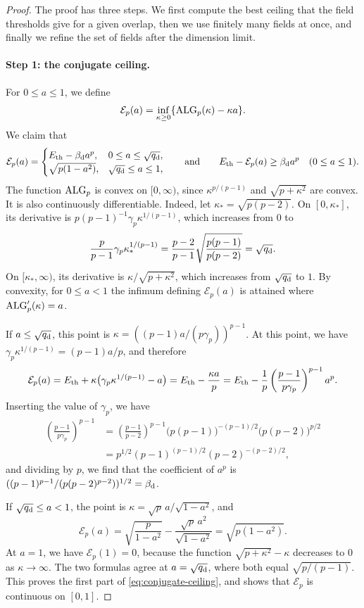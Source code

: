 \begin{proof}
The proof has three steps. We first compute the best ceiling that the field
thresholds give for a given overlap, then we use finitely many fields at
once, and finally we refine the set of fields after the dimension limit.

\paragraph{Step 1: the conjugate ceiling.}
For $0\le a\le1$, we define
\[
 \mathcal E_p(a)=\inf_{\kappa\ge0}\{\operatorname{ALG}_p(\kappa)-\kappa a\}.
\]
We claim that
\begin{equation}\label{eq:conjugate-ceiling}
 \mathcal E_p(a)=
 \begin{cases}
 E_{\mathrm{th}}-\beta_{\mathrm d} a^p,&0\le a\le\sqrt{q_{\mathrm d}},\\
 \sqrt{p(1-a^2)},&\sqrt{q_{\mathrm d}}\le a\le1,
 \end{cases}
 \qquad\text{and}\qquad
 E_{\mathrm{th}}-\mathcal E_p(a)\ge\beta_{\mathrm d} a^p\quad(0\le a\le1).
\end{equation}
The function $\operatorname{ALG}_p$ is convex on $[0,\infty)$, since $\kappa^{p/(p-1)}$ and
$\sqrt{p+\kappa^2}$ are convex. It is also continuously differentiable. Indeed, let $\kappa_*=\sqrt{p(p-2)}$. On $[0,\kappa_*]$, its derivative
is $p(p-1)^{-1}\gamma_p\kappa^{1/(p-1)}$, which increases from $0$ to
\[
 \frac p{p-1}\gamma_p\kappa_*^{1/(p-1)}
 =\frac{p-2}{p-1}\sqrt{\frac{p(p-1)}{p(p-2)}}=\sqrt{q_{\mathrm d}}.
\]
On $[\kappa_*,\infty)$, its derivative is $\kappa/\sqrt{p+\kappa^2}$,
which increases from $\sqrt{q_{\mathrm d}}$ to $1$. By convexity, for $0\le a<1$ the
infimum defining $\mathcal E_p(a)$ is attained where $\operatorname{ALG}_p'(\kappa)=a$.

If $a\le\sqrt{q_{\mathrm d}}$, this point is
$\kappa=((p-1)a/(p\gamma_p))^{p-1}$. At this point, we have $\gamma_p\kappa^{1/(p-1)}=(p-1)a/p$, and therefore
\[
 \mathcal E_p(a)=E_{\mathrm{th}}+\kappa\big(\gamma_p\kappa^{1/(p-1)}-a\big)
 =E_{\mathrm{th}}-\frac{\kappa a}p
 =E_{\mathrm{th}}-\frac1p\left(\frac{p-1}{p\gamma_p}\right)^{p-1}a^p.
\]
Inserting the value of $\gamma_p$, we have
\[
\begin{aligned}
 \left(\frac{p-1}{p\gamma_p}\right)^{p-1}
 &=\left(\frac{p-1}{p-2}\right)^{p-1}\big(p(p-1)\big)^{-(p-1)/2}
  \big(p(p-2)\big)^{p/2}\\
 &=p^{1/2}(p-1)^{(p-1)/2}(p-2)^{-(p-2)/2},
\end{aligned}
\]
and dividing by $p$, we find that the coefficient of $a^p$ is
$((p-1)^{p-1}/(p(p-2)^{p-2}))^{1/2}=\beta_{\mathrm d}$.

If $\sqrt{q_{\mathrm d}}\le a<1$, the point is $\kappa=\sqrt p\,a/\sqrt{1-a^2}$, and
\[
 \mathcal E_p(a)=\sqrt{\frac p{1-a^2}}-\frac{\sqrt p\,a^2}{\sqrt{1-a^2}}
 =\sqrt{p(1-a^2)}.
\]
At $a=1$, we have $\mathcal E_p(1)=0$, because the function
$\sqrt{p+\kappa^2}-\kappa$ decreases to $0$ as $\kappa\to\infty$. The two formulas agree at
$a=\sqrt{q_{\mathrm d}}$, where both equal $\sqrt{p/(p-1)}$. This proves the first
part of \eqref{eq:conjugate-ceiling}, and shows that $\mathcal E_p$ is
continuous on $[0,1]$.


\end{proof}
